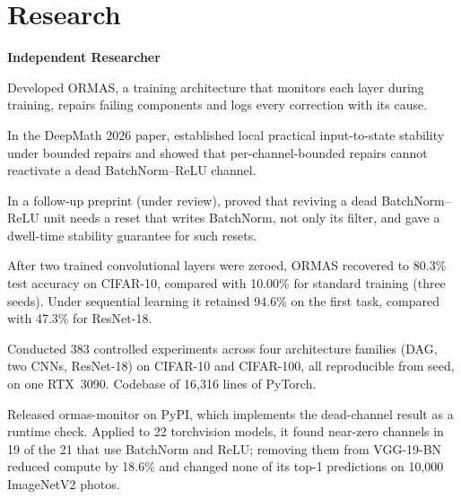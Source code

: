 \documentclass[10pt,a4paper]{article}
\newcommand{\cvitem}[3]{%
  \begin{list}{}{%
    \setlength{\leftmargin}{2.35cm}%
    \setlength{\labelwidth}{2.1cm}%
    \setlength{\labelsep}{0.25cm}%
    \setlength{\itemindent}{0pt}%
    \setlength{\listparindent}{0pt}%
    \setlength{\rightmargin}{0pt}%
    \setlength{\topsep}{0pt}%
    \setlength{\partopsep}{0pt}%
    \setlength{\parsep}{0pt}%
    \setlength{\itemsep}{0pt}%
  }%
  \item[{\makebox[2.1cm][l]{\footnotesize\color{muted}#1}}]%
  #2
  #3
  \end{list}%
  \vspace{1pt}
}
\begin{document}
\section*{Research}

\vspace{3pt}
\cvitem{2024--present}{%
  \textbf{Independent Researcher} \quad {\small ORMAS: self-repairing neural networks}
}{%
  \begin{bullets}
    \item Developed ORMAS, a training architecture that monitors each layer during training, repairs failing components and logs every correction with its cause.
    \item In the DeepMath 2026 paper, established local practical input-to-state stability under bounded repairs and showed that per-channel-bounded repairs cannot reactivate a dead BatchNorm--ReLU channel.
    \item In a follow-up preprint (under review), proved that reviving a dead BatchNorm--ReLU unit needs a reset that writes BatchNorm, not only its filter, and gave a dwell-time stability guarantee for such resets.
    \item After two trained convolutional layers were zeroed, ORMAS recovered to 80.3\% test accuracy on CIFAR-10, compared with 10.00\% for standard training (three seeds). Under sequential learning it retained 94.6\% on the first task, compared with 47.3\% for \mbox{ResNet-18}.
    \item Conducted 383 controlled experiments across four architecture families (DAG, two CNNs, \mbox{ResNet-18}) on CIFAR-10 and CIFAR-100, all reproducible from seed, on one RTX~3090. Codebase of 16,316 lines of PyTorch.
    \item Released ormas-monitor on PyPI, which implements the dead-channel result as a runtime check. Applied to 22 torchvision models, it found near-zero channels in 19 of the 21 that use BatchNorm and ReLU; removing them from VGG-19-BN reduced compute by 18.6\% and changed none of its top-1 predictions on 10,000 ImageNetV2 photos.
  \end{bullets}
}
\end{document}

